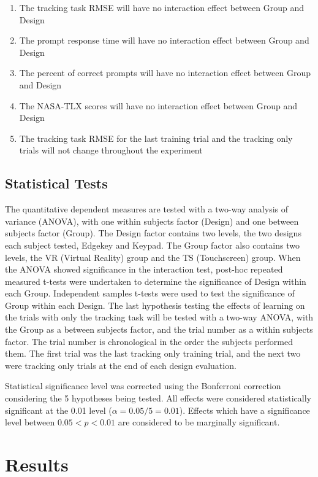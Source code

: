 \begin{enumerate}[label={H\arabic*.}]
    \item The tracking task RMSE will have no interaction effect between Group and Design
    \item The prompt response time will have no interaction effect between Group and Design
    \item The percent of correct prompts will have no interaction effect between Group and Design
    \item The NASA-TLX scores will have no interaction effect between Group and Design
    \item The tracking task RMSE for the last training trial and the tracking only trials will not change throughout the experiment
\end{enumerate}

\subsection{Statistical Tests}

The quantitative dependent measures are tested with a two-way analysis of variance (ANOVA), with one within subjects factor (Design) and one between subjects factor (Group).
The Design factor contains two levels, the two designs each subject tested, Edgekey and Keypad.
The Group factor also contains two levels, the VR (Virtual Reality) group and the TS (Touchscreen) group.
When the ANOVA showed significance in the interaction test, post-hoc repeated measured t-tests were undertaken to determine the significance of Design within each Group.
Independent samples t-tests were used to test the significance of Group within each Design.
The last hypothesis testing the effects of learning on the trials with only the tracking task will be tested with a two-way ANOVA, with the Group as a between subjects factor, and the trial number as a within subjects factor.
The trial number is chronological in the order the subjects performed them.
The first trial was the last tracking only training trial, and the next two were tracking only trials at the end of each design evaluation.

Statistical significance level was corrected using the Bonferroni correction considering the 5 hypotheses being tested.
All effects were considered statistically significant at the 0.01 level ($\alpha = 0.05/5 = 0.01$).
Effects which have a significance level between $0.05<p<0.01$ are considered to be marginally significant.

\section{Results}

